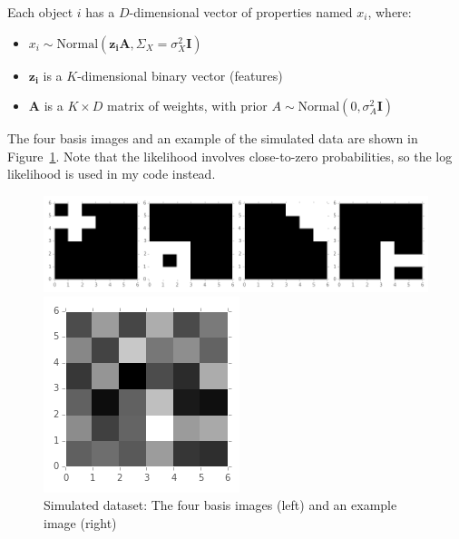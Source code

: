 Each object $i$ has a $D$-dimensional vector of properties named $x_i$, where:
\begin{itemize}
\item $x_i \sim \text{Normal}(\mathbf{z_i} \mathbf{A}, \Sigma_X = \sigma_X^2\mathbf{I})$
\item $\mathbf{z_i}$ is a $K$-dimensional binary vector (features)
\item $\mathbf{A}$ is a $K \times D$ matrix of weights, with prior $A \sim \text{Normal}(0,\sigma_A^2 \mathbf{I})$
\end{itemize}

The four basis images and an example of the simulated data are shown in Figure~\ref{fig:images}. Note that the likelihood involves close-to-zero probabilities, so the log likelihood is used in my code instead.

\begin{figure}[!ht]
\centering
    \begin{minipage}{0.8\linewidth}
    \includegraphics[width=\linewidth]{basis_images.png}
    \end{minipage}%
    \begin{minipage}{0.2\linewidth}
    \includegraphics[width=\linewidth]{example_image.png}
    \end{minipage}
    \caption{Simulated dataset: The four basis images (left) and an example image (right)}
    \label{fig:images}
\end{figure}

